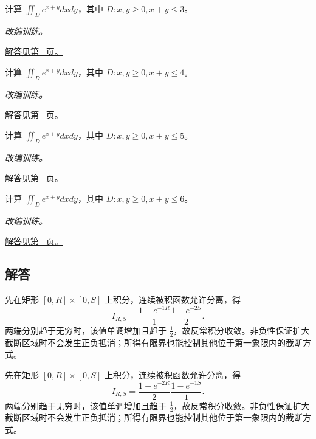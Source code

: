 \documentclass[12pt,fontset=fandol]{ctexart}
\begin{document}
\begin{example}[三角形上的指数密度]\label{ex:c40q21}
计算 $\displaystyle\iint_D e^{x+y}dxdy$，其中 $D:x,y\ge0,x+y\le 3$。
\par\textit{改编训练。}\par\hyperref[ans:c40q21]{解答见第~\pageref{ans:c40q21} 页。}
\end{example}
\begin{example}[三角形上的指数密度]\label{ex:c40q22}
计算 $\displaystyle\iint_D e^{x+y}dxdy$，其中 $D:x,y\ge0,x+y\le 4$。
\par\textit{改编训练。}\par\hyperref[ans:c40q22]{解答见第~\pageref{ans:c40q22} 页。}
\end{example}
\begin{example}[三角形上的指数密度]\label{ex:c40q23}
计算 $\displaystyle\iint_D e^{x+y}dxdy$，其中 $D:x,y\ge0,x+y\le 5$。
\par\textit{改编训练。}\par\hyperref[ans:c40q23]{解答见第~\pageref{ans:c40q23} 页。}
\end{example}
\begin{example}[三角形上的指数密度]\label{ex:c40q24}
计算 $\displaystyle\iint_D e^{x+y}dxdy$，其中 $D:x,y\ge0,x+y\le 6$。
\par\textit{改编训练。}\par\hyperref[ans:c40q24]{解答见第~\pageref{ans:c40q24} 页。}
\end{example}
\subsection{解答}
\begin{solve}\label{ans:c40q1}
先在矩形 $[0,R]\times[0,S]$ 上积分，连续被积函数允许分离，得
\[
I_{R,S}=\frac{1-e^{-1R}}{1}\frac{1-e^{-2S}}{2}.
\]
两端分别趋于无穷时，该值单调增加且趋于 $\frac{1}{2}$，故反常积分收敛。非负性保证扩大截断区域时不会发生正负抵消；所得有限界也能控制其他位于第一象限内的截断方式。
\end{solve}

\begin{solve}\label{ans:c40q2}
先在矩形 $[0,R]\times[0,S]$ 上积分，连续被积函数允许分离，得
\[
I_{R,S}=\frac{1-e^{-2R}}{2}\frac{1-e^{-1S}}{1}.
\]
两端分别趋于无穷时，该值单调增加且趋于 $\frac{1}{2}$，故反常积分收敛。非负性保证扩大截断区域时不会发生正负抵消；所得有限界也能控制其他位于第一象限内的截断方式。
\end{solve}
\end{document}
